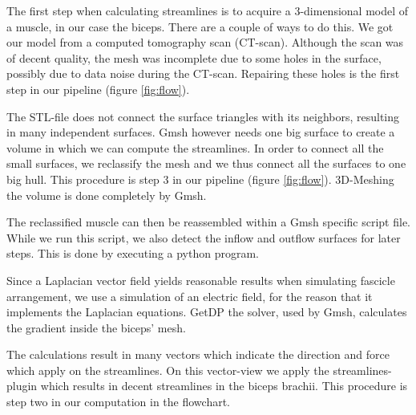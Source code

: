 \documentclass[preprint,journal]{vgtc}       %
\begin{document}
The first step when calculating streamlines is to acquire a 3-dimensional model of a muscle, in our case the biceps.
There are a couple of ways to do this.
We got our model from a computed tomography scan (CT-scan).
Although the scan was of decent quality, the mesh was incomplete due to some holes in the surface, possibly due to data noise during the CT-scan.
Repairing these holes is the first step in our pipeline (figure \ref{fig:flow}). 

The STL-file does not connect the surface triangles with its neighbors, resulting in many independent surfaces. 
Gmsh however needs one big surface to create a volume in which we can compute the streamlines. 
In order to connect all the small surfaces, we reclassify the mesh and we thus connect all the surfaces to one big hull.
This procedure is step 3 in our pipeline (figure \ref{fig:flow}). 
3D-Meshing the volume is done completely by Gmsh. 

The reclassified muscle can then be reassembled within a Gmsh specific script file.
While we run this script, we also detect the inflow and outflow surfaces for later steps.
This is done by executing a python program. 
 
Since a Laplacian vector field yields reasonable results when simulating fascicle arrangement, we use a simulation of an electric field, for the reason that it implements the Laplacian equations. 
GetDP the solver, used by Gmsh, calculates the gradient inside the biceps' mesh.

The calculations result in many vectors which indicate the direction and force which apply on the  streamlines. 
On this vector-view we apply the streamlines-plugin which results in decent streamlines in the biceps brachii.
This procedure is step two in our computation in the flowchart.
\end{document}
